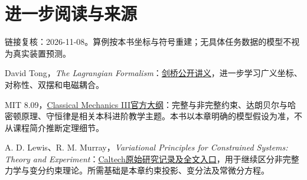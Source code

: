 \section*{进一步阅读与来源}
链接复核：2026-11-08。算例按本书坐标与符号重建；无具体任务数据的模型不视为真实装置预测。
\begin{bookreading}
\item David Tong，\textit{The Lagrangian Formalism}：\href{https://davidtong.org/pdfs/teaching/classical-dynamics/clas2.pdf}{剑桥公开讲义}，进一步学习广义坐标、对称性、双摆和电磁耦合。
\item MIT 8.09，\href{https://ocw.mit.edu/courses/8-09-classical-mechanics-iii-fall-2014/pages/syllabus/}{Classical Mechanics III官方大纲}：完整与非完整约束、达朗贝尔与哈密顿原理、守恒律是相关本科进阶教学主题。本书以本章明确的模型假设为准，不从课程简介推断定理细节。
\item A. D. Lewis、R. M. Murray，\textit{Variational Principles for Constrained Systems: Theory and Experiment}：\href{https://authors.library.caltech.edu/records/2pdbe-k1104}{Caltech原始研究记录及全文入口}，用于继续区分非完整力学与变分约束理论。所需基础是本章约束投影、变分法及常微分方程。
\end{bookreading}
